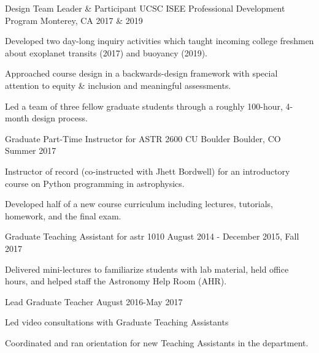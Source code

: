 

\begin{cventries}

  \cventry
  	{Design Team Leader \& Participant}
	{UCSC ISEE Professional Development Program}
	{Monterey, CA}
	{2017 \& 2019}
	{
		\begin{cvitems}
			\item Developed two day-long inquiry activities which taught incoming college freshmen about exoplanet transits (2017) and buoyancy (2019).
			\item Approached course design in a backwards-design framework with special attention to equity \& inclusion and meaningful assessments.
			\item Led a team of three fellow graduate students through a roughly 100-hour, 4-month design process.
		\end{cvitems}
	}


  \cventry
  	{Graduate Part-Time Instructor for ASTR 2600}
	{CU Boulder}
	{Boulder, CO}
	{Summer 2017}
	{
		\begin{cvitems}
			\item Instructor of record (co-instructed with Jhett Bordwell) for an introductory course on Python programming in astrophysics.
			\item Developed half of a new course curriculum including lectures, tutorials, homework, and the final exam.
		\end{cvitems}
	}


  \cventry
    {Graduate Teaching Assistant for astr 1010} %
    {} %
    {} %
    {August 2014 - December 2015, Fall 2017} %
    {
      \begin{cvitems} %
        \item {Delivered mini-lectures to familiarize students with lab material, held office hours, and helped staff the Astronomy Help Room (AHR).}
      \end{cvitems}
    }

  \cventry
    {Lead Graduate Teacher} %
    {} %
    {} %
    {August 2016-May 2017} %
    {
      \begin{cvitems} %
        \item {Led video consultations with Graduate Teaching Assistants}
        \item {Coordinated and ran orientation for new Teaching Assistants in the department.}
      \end{cvitems}
    }




\end{cventries}
